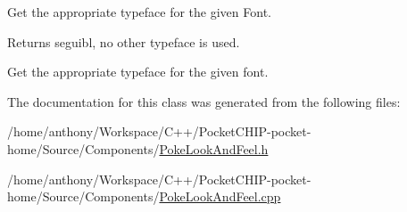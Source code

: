 Get the appropriate typeface for the given Font.

\begin{DoxyReturn}{Returns}
seguibl, no other typeface is used.
\end{DoxyReturn}
Get the appropriate typeface for the given font. 

The documentation for this class was generated from the following files\+:\begin{DoxyCompactItemize}
\item 
/home/anthony/\+Workspace/\+C++/\+Pocket\+C\+H\+I\+P-\/pocket-\/home/\+Source/\+Components/\mbox{\hyperlink{PokeLookAndFeel_8h}{Poke\+Look\+And\+Feel.\+h}}\item 
/home/anthony/\+Workspace/\+C++/\+Pocket\+C\+H\+I\+P-\/pocket-\/home/\+Source/\+Components/\mbox{\hyperlink{PokeLookAndFeel_8cpp}{Poke\+Look\+And\+Feel.\+cpp}}\end{DoxyCompactItemize}
